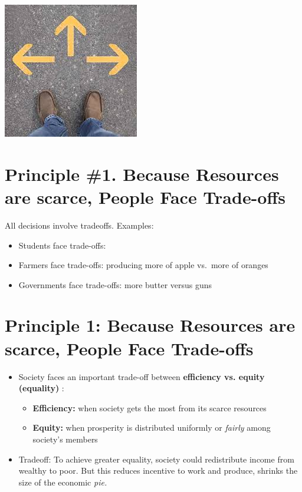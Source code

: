 \documentclass[
]{book}
\begin{document}
\includegraphics{imgs/fig1a}

\hypertarget{principle-1.-because-resources-are-scarce-people-face-trade-offs}{%
\section{Principle \#1. Because Resources are scarce, People Face Trade-offs}\label{principle-1.-because-resources-are-scarce-people-face-trade-offs}}

All decisions involve tradeoffs. Examples:

\begin{itemize}
\item
  Students face trade-offs:
\item
  Farmers face trade-offs: producing more of apple vs.~more of oranges
\item
  Governments face trade-offs: more butter versus guns
\end{itemize}

\hypertarget{principle-1-because-resources-are-scarce-people-face-trade-offs}{%
\section{Principle 1: Because Resources are scarce, People Face Trade-offs}\label{principle-1-because-resources-are-scarce-people-face-trade-offs}}

\begin{itemize}
\item
  Society faces an important trade-off between \textbf{\color{blue} efficiency vs. equity (equality) }:

  \begin{itemize}
  \item
    \textbf{Efficiency:} when society gets the most from its scarce resources
  \item
    \textbf{Equity:} when prosperity is distributed uniformly or \emph{fairly} among society's members
  \end{itemize}
\item
  Tradeoff: To achieve greater equality, society could redistribute income from wealthy to poor. But this reduces incentive to work and produce, shrinks the size of the economic \emph{pie.}
\end{itemize}
\end{document}
